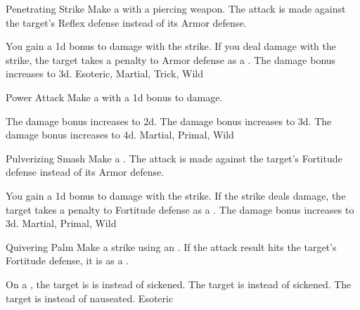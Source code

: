\lowercase{\hypertarget{maneuver:Penetrating Strike}{}}\label{maneuver:Penetrating Strike}
\hypertarget{maneuver:Penetrating Strike}{}
\begin{freeability}{Penetrating Strike}
Make a  with a piercing weapon.
The attack is made against the target's Reflex defense instead of its Armor defense.

\rankline
{} You gain a \plus1d bonus to damage with the strike.
 If you deal damage with the strike, the target takes a  penalty to Armor defense as a .
 The damage bonus increases to \plus3d.
 Esoteric, Martial, Trick, Wild
\end{freeability}
\vspace{0.25em}



\lowercase{\hypertarget{maneuver:Power Attack}{}}\label{maneuver:Power Attack}
\hypertarget{maneuver:Power Attack}{}
\begin{freeability}{Power Attack}
Make a  with a \plus1d bonus to damage.

\rankline
{} The damage bonus increases to \plus2d.
 The damage bonus increases to \plus3d.
 The damage bonus increases to \plus4d.
 Martial, Primal, Wild
\end{freeability}
\vspace{0.25em}



\lowercase{\hypertarget{maneuver:Pulverizing Smash}{}}\label{maneuver:Pulverizing Smash}
\hypertarget{maneuver:Pulverizing Smash}{}
\begin{freeability}{Pulverizing Smash}
Make a .
The attack is made against the target's Fortitude defense instead of its Armor defense.

\rankline
{} You gain a \plus1d bonus to damage with the strike.
 If the strike deals damage, the target takes a  penalty to Fortitude defense as a .
 The damage bonus increases to \plus3d.
 Martial, Primal, Wild
\end{freeability}
\vspace{0.25em}



\lowercase{\hypertarget{maneuver:Quivering Palm}{}}\label{maneuver:Quivering Palm}
\hypertarget{maneuver:Quivering Palm}{}
\begin{freeability}{Quivering Palm}
Make a strike using an .
If the attack result hits the target's Fortitude defense,
it is  as a .

\rankline
{} On a , the target is is  instead of sickened.
 The target is  instead of sickened.
 The target is  instead of nauseated.
 Esoteric
\end{freeability}
\vspace{0.25em}




